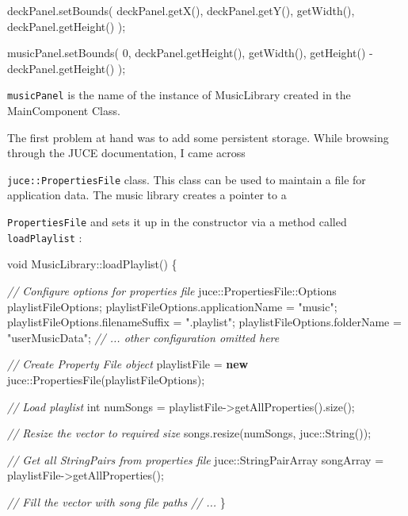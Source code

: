 \documentclass[12pt,]{article}
\newenvironment{Shaded}{}{}
\newcommand{\CommentTok}[1]{\textcolor[rgb]{0.38,0.63,0.69}{\textit{#1}}}
\newcommand{\DataTypeTok}[1]{\textcolor[rgb]{0.56,0.13,0.00}{#1}}
\newcommand{\DecValTok}[1]{\textcolor[rgb]{0.25,0.63,0.44}{#1}}
\newcommand{\KeywordTok}[1]{\textcolor[rgb]{0.00,0.44,0.13}{\textbf{#1}}}
\newcommand{\NormalTok}[1]{#1}
\newcommand{\StringTok}[1]{\textcolor[rgb]{0.25,0.44,0.63}{#1}}
\let\oldtexttt\texttt
\renewcommand{\texttt}[1]{
  \colorbox{bgcolor}{\oldtexttt{#1}}
}
\begin{document}
\begin{Shaded}
\begin{Highlighting}[]
\NormalTok{deckPanel.setBounds(}
\NormalTok{    deckPanel.getX(), }
\NormalTok{    deckPanel.getY(), }
\NormalTok{    getWidth(), }
\NormalTok{    deckPanel.getHeight()}
\NormalTok{);}

\NormalTok{musicPanel.setBounds(}
    \DecValTok{0}\NormalTok{, }
\NormalTok{    deckPanel.getHeight(), }
\NormalTok{    getWidth(), }
\NormalTok{    getHeight() - deckPanel.getHeight()}
\NormalTok{);}
\end{Highlighting}
\end{Shaded}

\texttt{musicPanel} is the name of the instance of MusicLibrary created
in the MainComponent Class.

The first problem at hand was to add some persistent storage. While
browsing through the JUCE documentation, I came across
\texttt{juce::PropertiesFile} class. This class can be used to maintain
a file for application data. The music library creates a pointer to a
\texttt{PropertiesFile} and sets it up in the constructor via a method
called \texttt{loadPlaylist}:

\begin{Shaded}
\begin{Highlighting}[]
\DataTypeTok{void}\NormalTok{ MusicLibrary::loadPlaylist() \{}

    \CommentTok{// Configure options for properties file}
\NormalTok{    juce::PropertiesFile::Options playlistFileOptions;}
\NormalTok{    playlistFileOptions.applicationName = }\StringTok{"music"}\NormalTok{;}
\NormalTok{    playlistFileOptions.filenameSuffix = }\StringTok{".playlist"}\NormalTok{;}
\NormalTok{    playlistFileOptions.folderName = }\StringTok{"userMusicData"}\NormalTok{;}
    \CommentTok{// ... other configuration omitted here}

    \CommentTok{// Create Property File object}
\NormalTok{    playlistFile = }\KeywordTok{new}\NormalTok{ juce::PropertiesFile(playlistFileOptions);}

    \CommentTok{// Load playlist}
    \DataTypeTok{int}\NormalTok{ numSongs = playlistFile->getAllProperties().size();}

    \CommentTok{// Resize the vector to required size}
\NormalTok{    songs.resize(numSongs, juce::String());}

    \CommentTok{// Get all StringPairs from properties file}
\NormalTok{    juce::StringPairArray songArray = playlistFile->getAllProperties();}

    \CommentTok{// Fill the vector with song file paths}
    \CommentTok{// ...}
\NormalTok{\}}
\end{Highlighting}
\end{Shaded}
\end{document}
